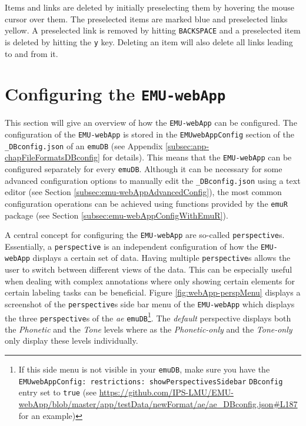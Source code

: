 \documentclass[]{book}
\begin{document}
Items and links are deleted by initially preselecting them by hovering the mouse cursor over them. The preselected items are marked blue and preselected links yellow. A preselected link is removed by hitting \texttt{BACKSPACE} and a preselected item is deleted by hitting the \texttt{y} key. Deleting an item will also delete all links leading to and from it.

\hypertarget{configuring-the-emu-webapp}{%
\section{\texorpdfstring{Configuring the \texttt{EMU-webApp}}{Configuring the EMU-webApp}}\label{configuring-the-emu-webapp}}

This section will give an overview of how the \texttt{EMU-webApp} can be configured. The configuration of the \texttt{EMU-webApp} is stored in the \texttt{EMUwebAppConfig} section of the \texttt{\_DBconfig.json} of an \texttt{emuDB} (see Appendix \ref{subsec:app-chapFileFormatsDBconfig} for details). This means that the \texttt{EMU-webApp} can be configured separately for every \texttt{emuDB}. Although it can be necessary for some advanced configuration options to manually edit the \texttt{\_DBconfig.json} using a text editor (see Section \ref{subsec:emu-webAppAdvancedConfig}), the most common configuration operations can be achieved using functions provided by the \texttt{emuR} package (see Section \ref{subsec:emu-webAppConfigWithEmuR}).

A central concept for configuring the \texttt{EMU-webApp} are so-called \texttt{perspective}s. Essentially, a \texttt{perspective} is an independent configuration of how the \texttt{EMU-webApp} displays a certain set of data. Having multiple \texttt{perspective}s allows the user to switch between different views of the data. This can be especially useful when dealing with complex annotations where only showing certain elements for certain labeling tasks can be beneficial. Figure \ref{fig:webApp-perspMenu} displays a screenshot of the \texttt{perspective}s side bar menu of the \texttt{EMU-webApp} which displays the three \texttt{perspective}s of the \emph{ae} \texttt{emuDB}\footnote{If this side menu is not visible in your \texttt{emuDB}, make sure you have the \texttt{EMUwebAppConfig:\ restrictions:\ showPerspectivesSidebar} \texttt{DBconfig} entry set to \texttt{true} (see \url{https://github.com/IPS-LMU/EMU-webApp/blob/master/app/testData/newFormat/ae/ae_DBconfig.json\#L187} for an example)}. The \emph{default} perspective displays both the \emph{Phonetic} and the \emph{Tone} levels where as the \emph{Phonetic-only} and the \emph{Tone-only} only display these levels individually.
\end{document}
